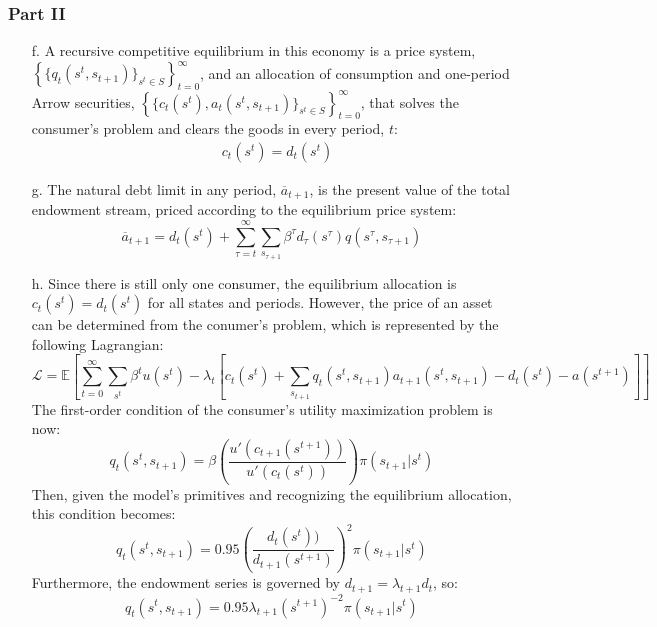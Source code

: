 \documentclass{article}
\renewcommand{\L}{\mathcal{L}}
\newcommand{\E}[1]{\mathbb{E}\left[#1\right]} %
\begin{document}
\subsubsection*{Part II}
\begin{itemize}
	\item[f.] A recursive competitive equilibrium in this economy is a price system, ${\left\{\{q_t(s^t,s_{t+1})\}_{s^t\in S}\right\}_{t=0}^\infty}$, and an allocation of consumption and one-period Arrow securities, ${\left\{\{c_t(s^t),a_t(s^t,s_{t+1})\}_{s^t\in S}\right\}_{t=0}^\infty}$, that solves the consumer's problem and clears the goods in every period, $t$:
		\begin{align*} &c_t(s^t) = d_t(s^t)  \end{align*}
		
		
	\item[g.] The natural debt limit in any period, $\overline{a}_{t+1}$, is the present value of the  total endowment stream, priced according to the equilibrium price system:
		\[
			\overline{a}_{t+1} = d_t(s^t) + \sum_{\tau=t}^\infty\sum_{s_{\tau+1}}\beta^\tau d_\tau(s^\tau)q(s^\tau,s_{\tau+1})
		\]
	
	\item[h.] Since there is still only one consumer, the equilibrium allocation is ${c_t(s^t)=d_t(s^t)}$ for all states and periods. However, the price of an asset can be determined from the conumer's problem, which is represented by the following Lagrangian:
	$$ \L = \E{\sum_{t=0}^\infty\sum_{s^t}\beta^tu(s^t) - \lambda_t\left[c_t(s^t) + \sum_{s_{t+1}}q_t(s^t,s_{t+1})a_{t+1}(s^t,s_{t+1})-d_t(s^t)-a(s^{t+1})\right] }$$
	The first-order condition of the consumer's utility maximization problem is now:
	\[
		q_t(s^t,s_{t+1}) = \beta\left(\frac{u'(c_{t+1}(s^{t+1}))}{u'(c_t(s^t))}\right)\pi(s_{t+1}|s^t)
	\]
	Then, given the model's primitives and recognizing the equilibrium allocation, this condition becomes:
	\[
		q_t(s^t,s_{t+1}) = 0.95\left(\frac{d_t(s^t))}{d_{t+1}(s^{t+1})}\right)^2\pi(s_{t+1}|s^t)
	\]
	Furthermore, the endowment series is governed by ${d_{t+1} = \lambda_{t+1}d_t}$, so:
	\[
		q_t(s^t,s_{t+1}) = 0.95\lambda_{t+1}(s^{t+1})^{-2}\pi(s_{t+1}|s^t)
	\]
	

\end{itemize}
\end{document}
